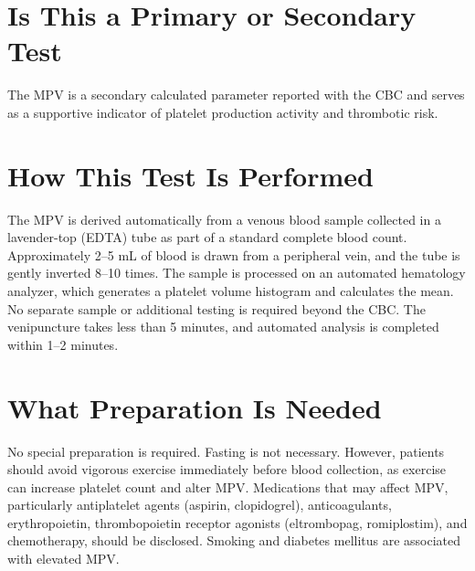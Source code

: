 \section*{Is This a Primary or Secondary Test}
The MPV is a secondary calculated parameter reported with the CBC and serves as a supportive indicator of platelet production activity and thrombotic risk.

\section*{How This Test Is Performed}
The MPV is derived automatically from a venous blood sample collected in a lavender-top (EDTA) tube as part of a standard complete blood count. Approximately 2--5 mL of blood is drawn from a peripheral vein, and the tube is gently inverted 8--10 times. The sample is processed on an automated hematology analyzer, which generates a platelet volume histogram and calculates the mean. No separate sample or additional testing is required beyond the CBC. The venipuncture takes less than 5 minutes, and automated analysis is completed within 1--2 minutes.

\section*{What Preparation Is Needed}
No special preparation is required. Fasting is not necessary. However, patients should avoid vigorous exercise immediately before blood collection, as exercise can increase platelet count and alter MPV. Medications that may affect MPV, particularly antiplatelet agents (aspirin, clopidogrel), anticoagulants, erythropoietin, thrombopoietin receptor agonists (eltrombopag, romiplostim), and chemotherapy, should be disclosed. Smoking and diabetes mellitus are associated with elevated MPV.


